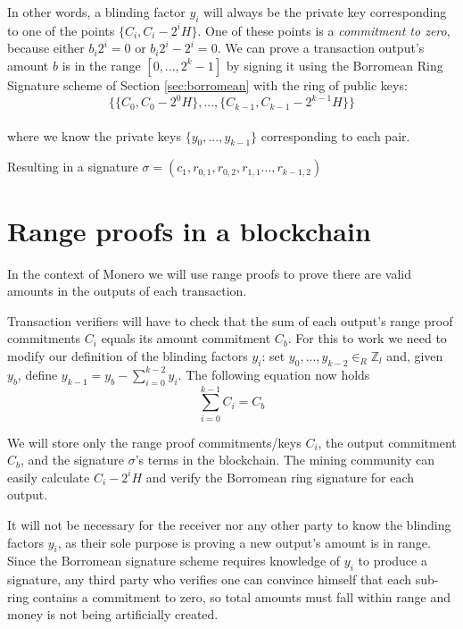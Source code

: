 In other words, a blinding factor \(y_i\) will always be the private key corresponding to one of the points \(\{C_i, C_i - 2^i H\}\). One of these points is a {\em commitment to zero}, because either $b_i 2^i = 0$ or $b_i 2^i - 2^i = 0$. We can prove a transaction output's amount $b$ is in the range $[0, ..., 2^{k} -1]$ by signing it using the Borromean Ring Signature scheme of Section \ref{sec:borromean} with the ring of public keys:
\[\{ \{C_0, C_0 - 2^0 H\}, ..., \{C_{k-1}, C_{k-1} - 2^{k-1} H\}  \}\]\\
where we know the private keys $\{y_0, ..., y_{k-1}\}$ corresponding to each pair.

\begin{center}
    Resulting in a signature $\sigma = (c_1, r_{0,1}, r_{0,2}, r_{1,1}..., r_{k-1,2})$
\end{center}


\section{Range proofs in a blockchain}
\label{range_proofs_blockchain_section}

In the context of Monero we will use range proofs to prove there are valid amounts in the outputs of each transaction.

Transaction verifiers will have to check that the sum of each output's range proof commitments $C_i$ equals its amount commitment $C_b$. For this to work we need to modify our definition of the blinding factors $y_i$: set $y_0, ..., y_{k-2} \in_R \mathbb{Z}_l$ and, given $y_b$, define $y_{k-1} = y_b - \sum_{i=0}^{k-2} y_i$. The following equation now holds
\[\sum^{k-1}_{i=0} C_i = C_b\]

We will store only the range proof commitments/keys $C_i$, the output commitment $C_b$, and the signature $\sigma$'s terms in the blockchain. The mining community can easily calculate $C_i - 2^i H$ and verify the Borromean ring signature for each output.

It will not be necessary for the receiver nor any other party to know the blinding factors $y_i$, as their sole purpose is proving a new output's amount is in range. 
\\

Since the Borromean signature scheme requires knowledge of $y_i$ to produce a signature, any third party who verifies one can convince himself that each sub-ring contains a commitment to zero, so total amounts must fall within range and money is not being artificially created.

